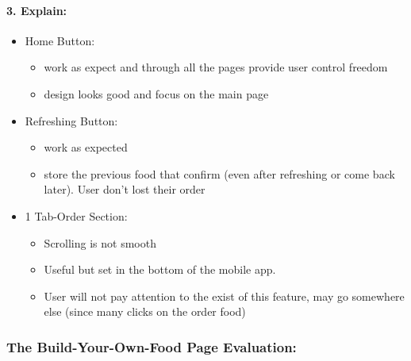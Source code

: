 \documentclass[
]{article}
\providecommand{\tightlist}{%
  \setlength{\itemsep}{0pt}\setlength{\parskip}{0pt}}
\begin{document}
\hypertarget{explain}{%
\paragraph{3. Explain:}\label{explain}}

\begin{itemize}
\tightlist
\item
  Home Button:

  \begin{itemize}
  \tightlist
  \item
    work as expect and through all the pages provide user control
    freedom
  \item
    design looks good and focus on the main page
  \end{itemize}
\end{itemize}

\begin{itemize}
\tightlist
\item
  Refreshing Button:

  \begin{itemize}
  \tightlist
  \item
    work as expected
  \item
    store the previous food that confirm (even after refreshing or come
    back later). User don't lost their order
  \end{itemize}
\end{itemize}

\begin{itemize}
\tightlist
\item
  1 Tab-Order Section:

  \begin{itemize}
  \tightlist
  \item
    Scrolling is not smooth
  \item
    Useful but set in the bottom of the mobile app.
  \item
    User will not pay attention to the exist of this feature, may go
    somewhere else (since many clicks on the order food)
  \end{itemize}
\end{itemize}

\hypertarget{the-build-your-own-food-page-evaluation}{%
\subsubsection{The Build-Your-Own-Food Page
Evaluation:}\label{the-build-your-own-food-page-evaluation}}
\end{document}
